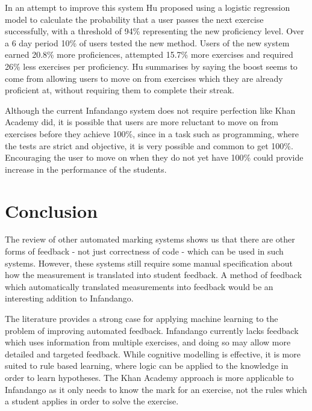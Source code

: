 In an attempt to improve this system Hu proposed using a logistic regression model to calculate the probability that a user passes the next exercise successfully, with a threshold of 94\% representing the new proficiency level. Over a 6 day period 10\% of users tested the new method. Users of the new system earned 20.8\% more proficiences, attempted 15.7\% more exercises and required 26\% less exercises per proficiency. Hu summarises by saying the boost seems to come from allowing users to move on from exercises which they are already proficient at, without requiring them to complete their streak.

Although the current Infandango system does not require perfection like Khan Academy did, it is possible that users are more reluctant to move on from exercises before they achieve 100\%, since in a task such as programming, where the tests are strict and objective, it is very possible and common to get 100\%. Encouraging the user to move on when they do not yet have 100\% could provide increase in the performance of the students.


\section{Conclusion}
The review of other automated marking systems shows us that there are other forms of feedback - not just correctness of code - which can be used in such systems. However, these systems still require some manual specification about how the measurement is translated into student feedback. A method of feedback which automatically translated measurements into feedback would be an interesting addition to Infandango.

The literature provides a strong case for applying machine learning to the problem of improving automated feedback. Infandango currently lacks feedback which uses information from multiple exercises, and doing so may allow more detailed and targeted feedback. While cognitive modelling is effective, it is more suited to rule based learning, where logic can be applied to the knowledge in order to learn hypotheses. The Khan Academy approach is more applicable to Infandango as it only needs to know the mark for an exercise, not the rules which a student applies in order to solve the exercise.

